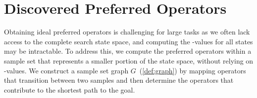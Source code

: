 \documentclass[ppgc,diss,english]{iiufrgs}
\begin{document}
%
%



\section{Discovered Preferred Operators}
\label{sec:sample-discovered-po}
Obtaining ideal preferred operators is challenging for large tasks as we often lack access to the complete search state space, and computing the \hstar-values for all states may be intractable. To address this, we compute the preferred operators within a sample set that represents a smaller portion of the state space, without relying on \hstar-values. We construct a sample set graph $G$~(\cref{def:graph}) by mapping operators that transition between two samples and then determine the operators that contribute to the shortest path to the goal.
\end{document}
